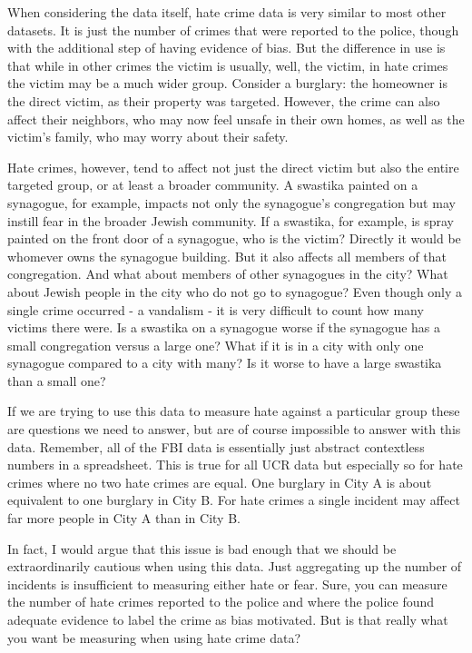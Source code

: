 \documentclass[
]{krantz}
\begin{document}
When considering the data itself, hate crime data is very
similar to most other datasets. It is just the number of
crimes that were reported to the police, though with the
additional step of having evidence of bias. But the
difference in use is that while in other crimes the victim
is usually, well, the victim, in hate crimes the victim may
be a much wider group. Consider a burglary: the homeowner is
the direct victim, as their property was targeted. However,
the crime can also affect their neighbors, who may now feel
unsafe in their own homes, as well as the victim's family,
who may worry about their safety.

Hate crimes, however, tend to affect not just the direct
victim but also the entire targeted group, or at least a
broader community. A swastika painted on a synagogue, for
example, impacts not only the synagogue's congregation but
may instill fear in the broader Jewish community. If a
swastika, for example, is spray painted on the front door of
a synagogue, who is the victim? Directly it would be
whomever owns the synagogue building. But it also affects
all members of that congregation. And what about members of
other synagogues in the city? What about Jewish people in
the city who do not go to synagogue? Even though only a
single crime occurred - a vandalism - it is very difficult
to count how many victims there were. Is a swastika on a
synagogue worse if the synagogue has a small congregation
versus a large one? What if it is in a city with only one
synagogue compared to a city with many? Is it worse to have
a large swastika than a small one?

If we are trying to use this data to measure hate against a
particular group these are questions we need to answer, but
are of course impossible to answer with this data. Remember,
all of the FBI data is essentially just abstract contextless
numbers in a spreadsheet. This is true for all UCR data but
especially so for hate crimes where no two hate crimes are
equal. One burglary in City A is about equivalent to one
burglary in City B. For hate crimes a single incident may
affect far more people in City A than in City B.

In fact, I would argue that this issue is bad enough that we
should be extraordinarily cautious when using this data.
Just aggregating up the number of incidents is insufficient
to measuring either hate or fear. Sure, you can measure the
number of hate crimes reported to the police and where the
police found adequate evidence to label the crime as bias
motivated. But is that really what you want be measuring
when using hate crime data?
\end{document}

